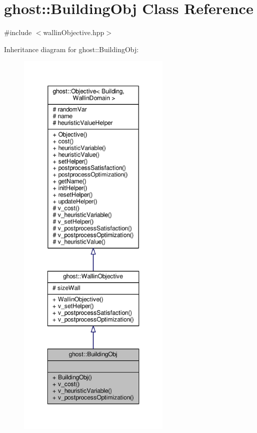 \hypertarget{classghost_1_1BuildingObj}{\section{ghost\-:\-:Building\-Obj Class Reference}
\label{classghost_1_1BuildingObj}
}


{\ttfamily \#include $<$wallin\-Objective.\-hpp$>$}



Inheritance diagram for ghost\-:\-:Building\-Obj\-:\nopagebreak
\begin{figure}[H]
\begin{center}
\leavevmode
\includegraphics[height=550pt]{classghost_1_1BuildingObj__inherit__graph}
\end{center}
\end{figure}


